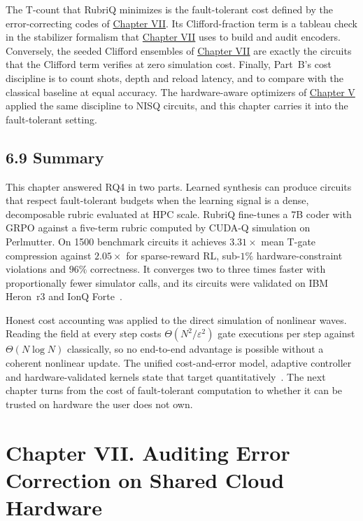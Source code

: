 \documentclass{report}
\theoremstyle{plain}
\theoremstyle{definition}
\theoremstyle{remark}
\newcommand{\eps}{\varepsilon}
\begin{document}
The T-count that RubriQ minimizes is the fault-tolerant cost defined by the error-correcting codes of \hyperref[ch:qec]{Chapter VII}. Its Clifford-fraction term is a tableau check in the stabilizer formalism that \hyperref[ch:qec]{Chapter VII} uses to build and audit encoders. Conversely, the seeded Clifford ensembles of \hyperref[ch:qec]{Chapter VII} are exactly the circuits that the Clifford term verifies at zero simulation cost. Finally, Part~B's cost discipline is to count shots, depth and reload latency, and to compare with the classical baseline at equal accuracy. The hardware-aware optimizers of \hyperref[ch:nisq]{Chapter V} applied the same discipline to NISQ circuits, and this chapter carries it into the fault-tolerant setting.

\section{6.9 Summary}\label{sec:syn:summary}

This chapter answered RQ4 in two parts. Learned synthesis can produce circuits that respect fault-tolerant budgets when the learning signal is a dense, decomposable rubric evaluated at HPC scale. RubriQ fine-tunes a 7B coder with GRPO against a five-term rubric computed by CUDA-Q simulation on Perlmutter. On 1500 benchmark circuits it achieves $3.31\times$ mean T-gate compression against $2.05\times$ for sparse-reward RL, sub-$1\%$ hardware-constraint violations and $96\%$ correctness. It converges two to three times faster with proportionally fewer simulator calls, and its circuits were validated on IBM Heron~r3 and IonQ Forte~\cite{guo2026rubriq}.

Honest cost accounting was applied to the direct simulation of nonlinear waves. Reading the field at every step costs $\Theta(N^{2}/\eps^{2})$ gate executions per step against $\Theta(N\log N)$ classically, so no end-to-end advantage is possible without a coherent nonlinear update. The unified cost-and-error model, adaptive controller and hardware-validated kernels state that target quantitatively~\cite{guo2026nonlinearwaves}. The next chapter turns from the cost of fault-tolerant computation to whether it can be trusted on hardware the user does not own.


\chapter{Chapter VII. Auditing Error Correction on Shared Cloud Hardware}\label{ch:qec}
\end{document}
